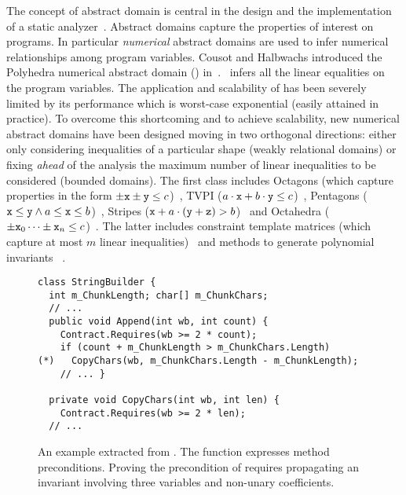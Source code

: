 \documentclass[sttt]{svjour}
\begin{document}
The concept of abstract domain is central in the design and the implementation of a static analyzer~\cite{CousotCousot77}.
Abstract domains capture the properties of interest on programs.
In particular \emph{numerical} abstract domains are used to infer numerical relationships among program variables.
Cousot and Halbwachs introduced the Polyhedra numerical abstract domain (\Polyhedra) in~\cite{CousotHalbwachs78}.
\Polyhedra\  infers all the linear equalities on the program variables.
The application and scalability of \Polyhedra{} has been severely limited by its performance which is worst-case exponential (easily attained in practice).
To overcome this shortcoming and to achieve scalability, new numerical abstract domains have been designed moving in two orthogonal directions: either only considering  inequalities of a particular shape (weakly relational domains) or fixing \emph{ahead} of the analysis the maximum number of linear inequalities to be considered (bounded domains).
The first class includes Octagons (which capture properties in the form $\pm \mathtt{x} \pm \mathtt{y} \leq c$)~\cite{Mine01-2}, TVPI ($a \cdot \mathtt{x} + b \cdot \mathtt{y} \leq c$)~\cite{SimonKing02-2}, Pentagons ($\mathtt{x} \leq \mathtt{y} \wedge a \leq \mathtt{x} \leq b$)~\cite{LogozzoMaf08}, Stripes ($\mathtt{x} + a \cdot (\mathtt{y} + \mathtt{z}) > b$)~\cite{FerraraLogozzoMaf08} and Octahedra ($\pm \mathtt{x}_0 \dots \pm \mathtt{x}_n \leq c$)~\cite{ClarisoCortadella04}.
The latter includes constraint template matrices (which capture at most $m$ linear inequalities)~\cite{Sankaranarayanan05,GulwaniEtAl08-2} and  methods to generate polynomial invariants \eg~\cite{MullerSeidl04-2,CarbonellKapur07,Kovacs08}.

\begin{figure}%
{
\small
\begin{Verbatim}
class StringBuilder {
  int m_ChunkLength; char[] m_ChunkChars;
  // ...
  public void Append(int wb, int count) {
    Contract.Requires(wb >= 2 * count); 
    if (count + m_ChunkLength > m_ChunkChars.Length)        
(*)   CopyChars(wb, m_ChunkChars.Length - m_ChunkLength);
    // ... }
  
  private void CopyChars(int wb, int len) {
    Contract.Requires(wb >= 2 * len); 
  // ...  
\end{Verbatim}
}
\caption{An example extracted from . The function  expresses method preconditions. Proving the precondition of  requires propagating an invariant involving three variables and non-unary coefficients.}
\label{fig:ex_vance}
\end{figure}
\end{document}
